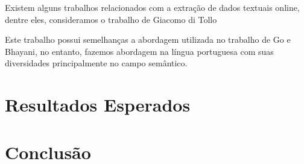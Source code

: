 \documentclass[12pt]{article}
\begin{document}
Existem alguns trabalhos relacionados com a extração de dados textuais online, dentre eles, consideramos o trabalho de Giacomo di Tollo

Este trabalho possui semelhanças a abordagem utilizada no trabalho de Go e Bhayani, no entanto, fazemos abordagem na língua portuguesa com suas diversidades principalmente no campo semântico.

\section{Resultados Esperados} \label{sec:Result}

\section{Conclusão} \label{sec:concl}

\newpage


\end{document}
